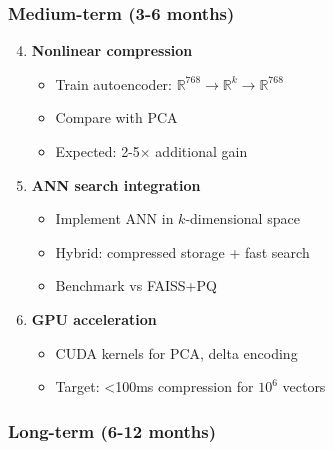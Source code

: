 \documentclass[11pt,a4paper]{article}
\begin{document}
\subsubsection{Medium-term (3-6 months)}

\begin{enumerate}
\setcounter{enumi}{3}
\item \textbf{Nonlinear compression}
   \begin{itemize}
   \item Train autoencoder: $\mathbb{R}^{768} \to \mathbb{R}^k \to \mathbb{R}^{768}$
   \item Compare with PCA
   \item Expected: 2-5$\times$ additional gain
   \end{itemize}

\item \textbf{ANN search integration}
   \begin{itemize}
   \item Implement ANN in $k$-dimensional space
   \item Hybrid: compressed storage + fast search
   \item Benchmark vs FAISS+PQ
   \end{itemize}

\item \textbf{GPU acceleration}
   \begin{itemize}
   \item CUDA kernels for PCA, delta encoding
   \item Target: <100ms compression for $10^6$ vectors
   \end{itemize}
\end{enumerate}

\subsubsection{Long-term (6-12 months)}
\end{document}
